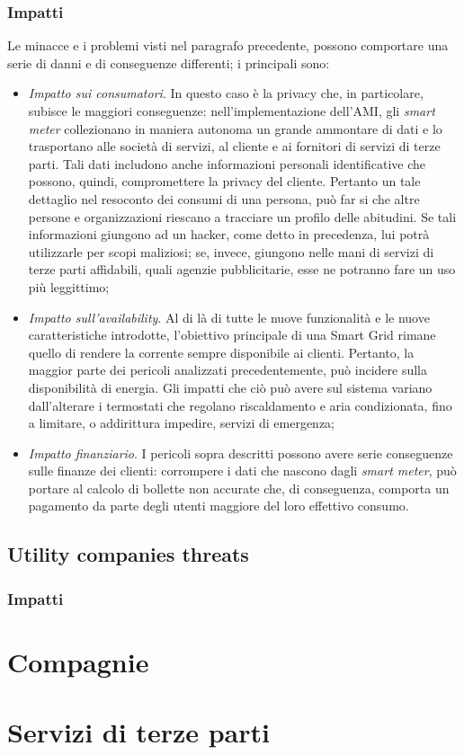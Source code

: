 \subsubsection{Impatti}
Le minacce e i problemi visti nel paragrafo precedente, possono comportare una serie di danni e di conseguenze differenti; i principali sono:
\begin{itemize}
\item \textit{Impatto sui consumatori}. In questo caso è la privacy che, in particolare, subisce le maggiori conseguenze: nell'implementazione dell'AMI, gli \textit{smart meter} collezionano in maniera autonoma un grande ammontare di dati e lo trasportano alle società di servizi, al cliente e ai fornitori di servizi di terze parti. Tali dati includono anche informazioni personali identificative che possono, quindi, compromettere la privacy del cliente. Pertanto un tale dettaglio nel resoconto dei consumi di una persona, può far si che altre persone e organizzazioni riescano a tracciare un profilo delle abitudini. Se tali informazioni giungono ad un hacker, come detto in precedenza, lui potrà utilizzarle per scopi maliziosi; se, invece, giungono nelle mani di servizi di terze parti affidabili, quali agenzie pubblicitarie, esse ne potranno fare un uso più leggittimo;
\item \textit{Impatto sull'availability}. Al di là di tutte le nuove funzionalità e le nuove caratteristiche introdotte, l'obiettivo principale di una Smart Grid rimane quello di rendere la corrente sempre disponibile ai clienti. Pertanto, la maggior parte dei pericoli analizzati precedentemente, può incidere sulla disponibilità di energia. Gli impatti che ciò può avere sul sistema variano dall'alterare i termostati che regolano riscaldamento e aria  condizionata, fino a limitare, o addirittura impedire, servizi di emergenza;
\item \textit{Impatto finanziario}. I pericoli sopra descritti possono avere serie conseguenze sulle finanze dei clienti: corrompere i dati che nascono dagli \textit{smart meter}, può portare al calcolo di bollette non accurate che, di conseguenza, comporta un pagamento da parte degli utenti maggiore del loro effettivo consumo.
\end{itemize}

\subsection{Utility companies threats}
\subsubsection{Impatti}
\section{Compagnie}

\section{Servizi di terze parti}

